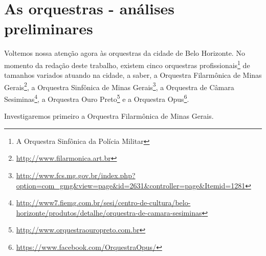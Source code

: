 \documentclass[a4paper, 12pt, openright, oneside, german, french, english, brazil]{abntex2}
\begin{document}
	\chapter{As orquestras - análises preliminares}






	Voltemos nossa atenção agora às orquestras da cidade de Belo Horizonte. No momento da redação deste trabalho, existem cinco orquestras profissionais\footnote{A Orquestra Sinfônica da Polícia Militar} de tamanhos variados atuando na cidade, a saber, a Orquestra Filarmônica de Minas Gerais\footnote{\url{http://www.filarmonica.art.br}}, a Orquestra Sinfônica de Minas Gerais\footnote{\url{http://www.fcs.mg.gov.br/index.php?option=com_gmg&view=page&id=2631&controller=page&Itemid=1281}}, a Orquestra de Câmara Sesiminas\footnote{\url{http://www7.fiemg.com.br/sesi/centro-de-cultura/belo-horizonte/produtos/detalhe/orquestra-de-camara-sesiminas}}, a Orquestra Ouro Preto\footnote{\url{http://www.orquestraouropreto.com.br}} e a Orquestra Opus\footnote{\url{https://www.facebook.com/OrquestraOpus/}}.



	Investigaremos primeiro a Orquestra Filarmônica de Minas Gerais.
\end{document}
